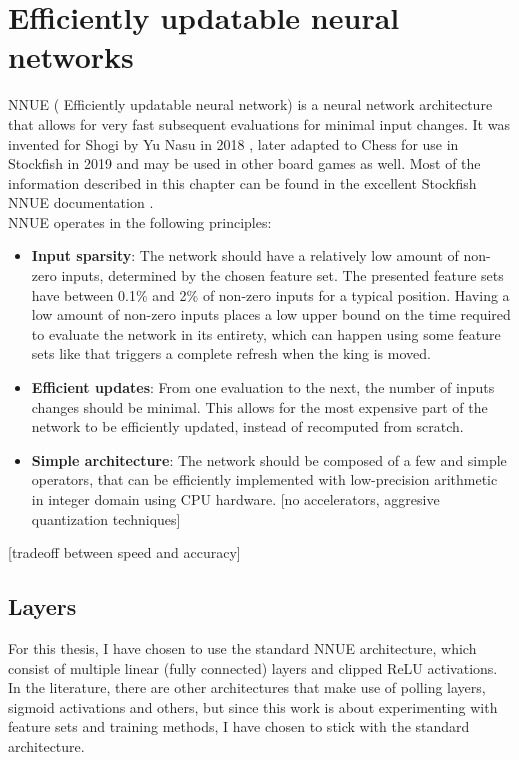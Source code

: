 \section{Efficiently updatable neural networks}

NNUE ( Efficiently updatable neural network) is a neural network architecture that allows for very fast subsequent evaluations for minimal input changes. It was invented for Shogi by Yu Nasu in 2018 \cite{nnue:2018}, later adapted to Chess for use in Stockfish in 2019 and may be used in other board games as well. Most of the information described in this chapter can be found in the excellent Stockfish NNUE documentation \cite{nnue-pytorch}. \\

NNUE operates in the following principles:

\begin{itemize}
    \item \textbf{Input sparsity}: The network should have a relatively low amount of non-zero inputs, determined by the chosen feature set. The presented feature sets have between 0.1\% and 2\% of non-zero inputs for a typical position. Having a low amount of non-zero inputs places a low upper bound on the time required to evaluate the network in its entirety, which can happen using some feature sets like  that triggers a complete refresh when the king is moved.
    \item \textbf{Efficient updates}: From one evaluation to the next, the number of inputs changes should be minimal. This allows for the most expensive part of the network to be efficiently updated, instead of recomputed from scratch.
    \item \textbf{Simple architecture}: The network should be composed of a few and simple operators, that can be efficiently implemented with low-precision arithmetic in integer domain using CPU hardware. [no accelerators, aggresive quantization techniques]
\end{itemize}

[tradeoff between speed and accuracy]

\subsection{Layers}

For this thesis, I have chosen to use the standard NNUE architecture, which consist of multiple linear (fully connected) layers and clipped ReLU activations. In the literature, there are other architectures that make use of polling layers, sigmoid activations and others, but since this work is about experimenting with feature sets and training methods, I have chosen to stick with the standard architecture.


